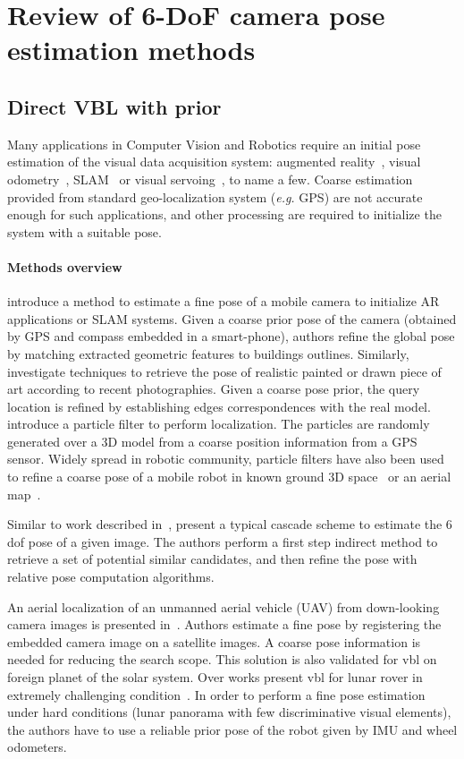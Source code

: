 \section{Review of 6-DoF camera pose estimation methods}
\subsection{Direct VBL with prior}
\label{vbl_prior}
Many applications in Computer Vision and Robotics require an initial  pose estimation of the visual data acquisition system: augmented reality~\citep{Arth2015}, visual odometry~\citep{Pascoe2015a}, SLAM~\citep{Milford2012} or visual servoing~\citep{Marchand2016}, to name a few. Coarse estimation provided from standard geo-localization system (\textit{e.g.} GPS) are not accurate enough for such applications, and other processing are required to initialize the system with a suitable pose.

\paragraph{Methods overview}
\citet{Arth2015} introduce a method to estimate a fine pose of a mobile camera to initialize AR applications or SLAM systems. Given a coarse prior pose of the camera (obtained by GPS and compass embedded in a smart-phone), authors refine the global pose by matching extracted geometric features to buildings outlines. Similarly, \citet{Russell2011} investigate techniques to retrieve the pose of realistic painted or drawn piece of art according to recent photographies. Given a coarse pose prior, the query location is refined by establishing edges correspondences with the real model. \citet{Poglitsch2015} introduce a particle filter to perform localization. The particles are randomly generated over a 3D model from a coarse position information from a GPS sensor. Widely spread in robotic community, particle filters have also been used to refine a coarse pose of a mobile robot in known ground 3D space~\citep{Mason2011} or an aerial map~\citep{Christie2016,Brubaker2016}.

Similar to work described in~\citep{Rubio2015,Sattler2017}, \citet{Song2016} present a typical cascade scheme to estimate the 6 \ac{dof} pose of a given image. The authors perform a first step indirect method to retrieve a set of potential similar candidates, and then refine the pose with relative pose computation algorithms. 

An aerial localization of an unmanned aerial vehicle (UAV) from down-looking camera images is presented in~\citep{Wan2016}. Authors estimate a fine pose by registering the embedded camera image on a satellite images. A coarse pose information is needed for reducing the search scope. This solution is also validated for \ac{vbl} on foreign planet of the solar system. Over works present \ac{vbl} for lunar rover in extremely challenging condition~\citep{Wan2014}. In order to perform a fine pose estimation under hard conditions (lunar panorama with few discriminative visual elements), the authors have to use a reliable prior pose of the robot given by IMU and wheel odometers.

